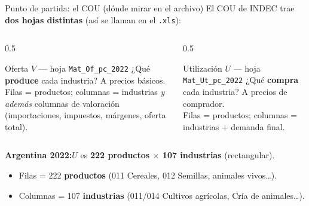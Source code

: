 \documentclass[aspectratio=169,10pt]{beamer}
\begin{document}
\begin{frame}{Punto de partida: el COU \small(dónde mirar en el archivo)}
  El COU de INDEC trae \textbf{dos hojas distintas} (así se llaman en el \texttt{.xls}):
  \begin{columns}
    \begin{column}{0.5\textwidth}
      \begin{block}{Oferta $V$ — hoja \texttt{Mat\_Of\_pc\_2022}}
      ¿Qué \textbf{produce} cada industria? A precios básicos. \\
      \footnotesize\color{gris} Filas = productos; columnas = industrias \emph{y además} columnas de valoración (importaciones, impuestos, márgenes, oferta total).
      \end{block}
    \end{column}
    \begin{column}{0.5\textwidth}
      \begin{block}{Utilización $U$ — hoja \texttt{Mat\_Ut\_pc\_2022}}
      ¿Qué \textbf{compra} cada industria? A precios de comprador. \\
      \footnotesize\color{gris} Filas = productos; columnas = industrias + demanda final.
      \end{block}
    \end{column}
  \end{columns}
  \vspace{0.4em}
  \begin{center}
  \textbf{Argentina 2022:}\quad $U$ es \textbf{222 productos $\times$ 107 industrias} (rectangular).
  \end{center}
  \begin{itemize}
    \item Filas = 222 \textbf{productos} (011 Cereales, 012 Semillas, animales vivos\ldots).
    \item Columnas = 107 \textbf{industrias} (011/014 Cultivos agrícolas, Cría de animales\ldots).
  \end{itemize}
\end{frame}
\end{document}
